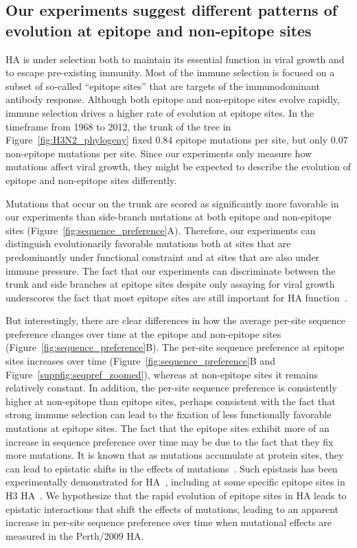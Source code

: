 \documentclass[9pt,twocolumn,twoside]{pnas-new}
\begin{document}
\subsection*{Our experiments suggest different patterns of evolution at epitope and non-epitope sites}
HA is under selection both to maintain its essential function in viral growth and to escape pre-existing immunity.
Most of the immune selection is focused on a subset of so-called ``epitope sites'' that are targets of the immunodominant antibody response.
Although both epitope and non-epitope sites evolve rapidly, immune selection drives a higher rate of evolution at epitope sites.
In the timeframe from 1968 to 2012, the trunk of the tree in Figure~\ref{fig:H3N2_phylogeny} fixed 0.84 epitope mutations per site, but only 0.07 non-epitope mutations per site.
Since our experiments only measure how mutations affect viral growth, they might be expected to describe the evolution of epitope and non-epitope sites differently.

Mutations that occur on the trunk are scored as significantly more favorable in our experiments than side-branch mutations at both epitope and non-epitope sites (Figure~\ref{fig:sequence_preference}A).
Therefore, our experiments can distinguish evolutionarily favorable mutations both at sites that are predominantly under functional constraint and at sites that are also under immune pressure.
The fact that our experiments can discriminate between the trunk and side branches at epitope sites despite only assaying for viral growth underscores the fact that most epitope sites are still important for HA function~\cite{nakajima2003restriction,das2013defining,koel2013substitutions}. 

But interestingly, there are clear differences in how the average per-site sequence preference changes over time at the epitope and non-epitope sites (Figure~\ref{fig:sequence_preference}B).
The per-site sequence preference at epitope sites increases over time (Figure~\ref{fig:sequence_preference}B and Figure~\ref{suppfig:seqpref_zoomed}), whereas at non-epitope sites it remains relatively constant.
In addition, the per-site sequence preference is consistently higher at non-epitope than epitope sites, perhaps consistent with the fact that strong immune selection can lead to the fixation of less functionally favorable mutations at epitope sites.
The fact that the epitope sites exhibit more of an increase in sequence preference over time may be due to the fact that they fix more mutations.
It is known that as mutations accumulate at protein sites, they can lead to epistatic shifts in the effects of mutations~\cite{gong2013stability,natarajan2013epistasis,harms2014historical,starr2016epistasis,starr2017alternative,haddox2017mapping}.
Such epistasis has been experimentally demonstrated for HA~\cite{das2013defining,myers2013compensatory}, including at some specific epitope sites in H3 HA~\cite{wu2017diversity}.
We hypothesize that the rapid evolution of epitope sites in HA leads to epistatic interactions that shift the effects of mutations, leading to an apparent increase in per-site sequence preference over time when mutational effects are measured in the Perth/2009 HA.
\end{document}
